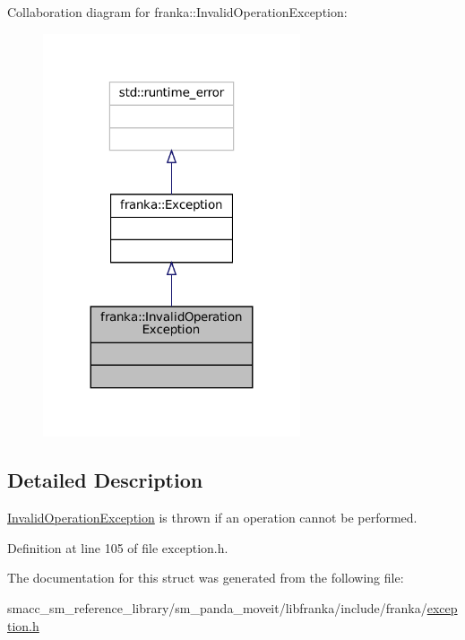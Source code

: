 Collaboration diagram for franka\+:\+:Invalid\+Operation\+Exception\+:
\nopagebreak
\begin{figure}[H]
\begin{center}
\leavevmode
\includegraphics[width=215pt]{structfranka_1_1InvalidOperationException__coll__graph}
\end{center}
\end{figure}


\subsection{Detailed Description}
\hyperlink{structfranka_1_1InvalidOperationException}{Invalid\+Operation\+Exception} is thrown if an operation cannot be performed. 

Definition at line 105 of file exception.\+h.



The documentation for this struct was generated from the following file\+:\begin{DoxyCompactItemize}
\item 
smacc\+\_\+sm\+\_\+reference\+\_\+library/sm\+\_\+panda\+\_\+moveit/libfranka/include/franka/\hyperlink{exception_8h}{exception.\+h}\end{DoxyCompactItemize}
